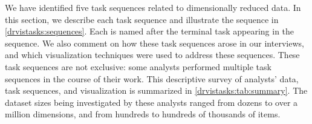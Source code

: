 We have identified five task sequences related to dimensionally reduced data.
In this section, we describe each task sequence and illustrate the sequence in \autoref{drvistasks:sequences}. 
Each is named after the terminal task appearing in the sequence.
We also comment on how these task sequences arose in our interviews, and which visualization techniques were used to address these sequences. 
These task sequences are not exclusive: some analysts performed multiple task sequences in the course of their work.
This descriptive survey of analysts' data, task sequences, and visualization is summarized in \autoref{drvistasks:tab:summary}. 
The dataset sizes being investigated by these analysts ranged from dozens to over a million dimensions, and from hundreds to hundreds of thousands of items.  


